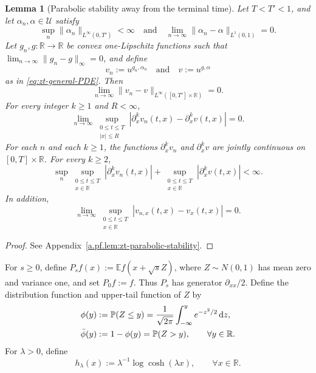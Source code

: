\documentclass[10pt]{amsart}
\newtheorem{lemma}[lemma]{Lemma}
\theoremstyle{definition}
\theoremstyle{remark}
\numberwithin{equation}{section}
\newcommand{\R}{\mathbb R}
\newcommand{\E}{\mathbb E}
\newcommand{\PP}{\mathbb P}
\newcommand{\1}{\mathbf 1}
\newcommand{\cU}{\mathcal U}
\newcommand{\dd}{\,\mathrm d}
\begin{document}
\begin{lemma}[Parabolic stability away from the terminal time]
\label{lem:zt-parabolic-stability}
Let $T<T'<1$, and let $\alpha_n,\alpha\in\cU$ satisfy
\begin{equation*}
 \sup_n\|\alpha_n\|_{L^\infty(0,T')}<\infty
 \quad\text{and}\quad
 \lim_{n\to\infty}\|\alpha_n-\alpha\|_{L^1(0,1)}=0.
\end{equation*}
Let $g_n,g:\R\to\R$ be convex one-Lipschitz functions such that $\lim_{n\to\infty}\|g_n-g\|_\infty=0$, and define
\begin{equation*}
 v_n:=u^{g_n,\alpha_n}\quad\text{and}\quad v:=u^{g,\alpha}
\end{equation*}
as in \eqref{eq:zt-general-PDE}. Then
\begin{equation}
 \lim_{n\to\infty}\|v_n-v\|_{L^\infty([0,T']\times\R)}=0.
 \label{eq:zt-parabolic-uniform-stability}
\end{equation}
For every integer $k\geq1$ and $R<\infty$,
\begin{equation}
 \lim_{n\to\infty}
 \sup_{\substack{0\leq t\leq T\\|x|\leq R}}
 |\partial_x^kv_n(t,x)-\partial_x^kv(t,x)|=0.
 \label{eq:zt-parabolic-Ck-stability}
\end{equation}
For each $n$ and each $k\geq1$, the functions $\partial_x^kv_n$ and $\partial_x^kv$ are jointly continuous on $[0,T]\times\R$. For every $k\geq2$,
\begin{equation}
 \sup_n\sup_{\substack{0\leq t\leq T\\x\in\R}}
 |\partial_x^kv_n(t,x)|
 +\sup_{\substack{0\leq t\leq T\\x\in\R}}
 |\partial_x^kv(t,x)|<\infty.
 \label{eq:zt-global-parabolic-derivative-bound}
\end{equation}
In addition,
\begin{equation}
 \lim_{n\to\infty}
 \sup_{\substack{0\leq t\leq T\\x\in\R}}
 |v_{n,x}(t,x)-v_x(t,x)|=0.
 \label{eq:zt-global-gradient-convergence}
\end{equation}
\end{lemma}

\begin{proof}
See Appendix~\ref{a.pf.lem:zt-parabolic-stability}.
\end{proof}

For $s\geq0$, define $P_sf(x):=\E f(x+\sqrt sZ)$, where $Z\sim N(0,1)$ has mean zero and variance one, and set $P_0f:=f$. Thus $P_s$ has generator $\partial_{xx}/2$. Define the distribution function and upper-tail function of $Z$ by
\begin{align}
 \phi(y)&:=\PP(Z\leq y)=\frac1{\sqrt{2\pi}}\int_{-\infty}^ye^{-z^2/2}\dd z,\notag\\
 \bar\phi(y)&:=1-\phi(y)=\PP(Z>y),
 \qquad \forall y\in\R.
 \label{eq:standard-Gaussian-functions}
\end{align}
For $\lambda>0$, define
\begin{equation}
 h_\lambda(x):=\lambda^{-1}\log\cosh(\lambda x),
 \qquad \forall x\in\R.
 \label{eq:zt-terminal-regularization}
\end{equation}
\end{document}

